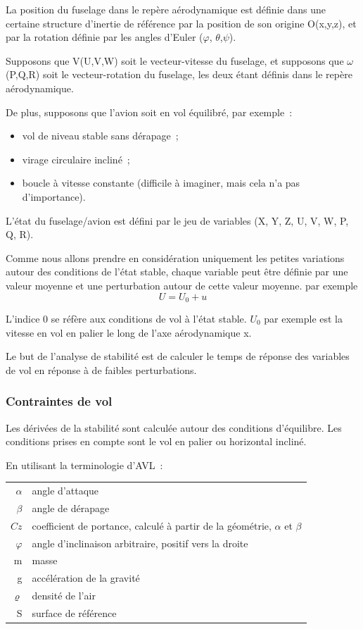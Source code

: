 \documentclass[a4paper,twoside,12pt,dvips]{article}
\begin{document}
La position du fuselage dans le repère aérodynamique est définie dans une
certaine structure d’inertie de référence par la position de son origine
O(x,y,z), et par la rotation définie par les angles d’Euler 
(\textrm{${\varphi}$, ${\theta}$,${\psi}$}).

Supposons que V(U,V,W) soit le vecteur-vitesse du fuselage, et supposons
que \textrm{${\omega}$}(P,Q,R) soit le vecteur-rotation du fuselage, les
deux étant définis dans le repère aérodynamique.

De plus, supposons que l’avion soit en vol équilibré, par exemple~:

\begin{itemize}
  \item vol de niveau stable sans dérapage~;
  \item virage circulaire incliné~;
  \item boucle à vitesse constante (difficile à imaginer, mais cela n’a
  pas d’importance).
\end{itemize}

L’état du fuselage/avion est défini par le jeu de variables (X, Y, Z,
U, V, W, P, Q, R).

Comme nous allons prendre en considération uniquement les petites variations
autour des conditions de l’état stable, chaque variable peut être définie par
une valeur moyenne et une perturbation autour de cette valeur moyenne. par
exemple 
$$U = U_0 + u$$

L’indice 0 se réfère aux conditions de vol à l’état stable. $U_0$ par exemple
est la vitesse en vol en palier le long de l’axe aérodynamique x.

Le but de l’analyse de stabilité est de calculer le temps de réponse des 
variables de vol en réponse à de faibles perturbations.

\subsubsection{Contraintes de vol}

Les dérivées de la stabilité sont calculée autour des conditions d’équilibre.
Les conditions prises en compte sont le vol en palier ou horizontal incliné.

En utilisant la terminologie d’AVL~:

\begin{tabular}{r@{\ :\ }l}
  $\alpha$ & angle d’attaque\\
  $\beta$ & angle de dérapage\\
  $Cz$ & coefficient de portance, calculé à partir de la géométrie,
  $\alpha$ et $\beta$\\
  $\varphi$ & angle d’inclinaison arbitraire, positif vers la droite\\
  m & masse\\
  g & accélération de la gravité\\
  $\varrho$ & densité de l’air\\
  S & surface de référence
\end{tabular}
\end{document}
